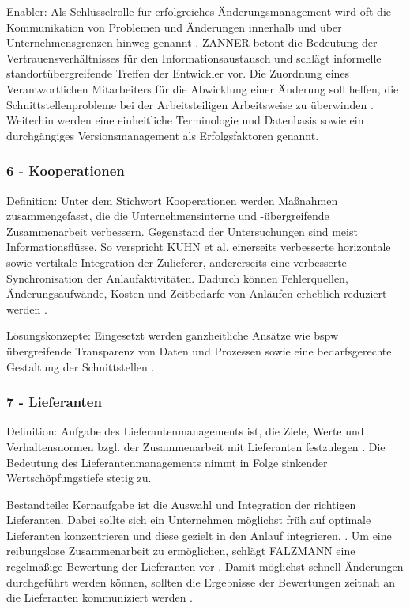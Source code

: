 Enabler: 
Als Schlüsselrolle für erfolgreiches Änderungsmanagement wird oft die Kommunikation von Problemen und Änderungen innerhalb und über Unternehmensgrenzen hinweg genannt \cite{Kuhn2002, Schuh2008}.
ZANNER betont die Bedeutung der Vertrauensverhältnisses für den Informationsaustausch und schlägt informelle standortübergreifende Treffen der Entwickler vor. Die Zuordnung eines Verantwortlichen Mitarbeiters für die Abwicklung einer Änderung soll helfen, die Schnittstellenprobleme bei der Arbeitsteiligen Arbeitsweise zu überwinden  \cite[42]{Zanner2002}.
Weiterhin werden eine einheitliche Terminologie \cite{Zanner2002} und Datenbasis sowie ein durchgängiges Versionsmanagement \cite{Kuhn2002} als Erfolgsfaktoren genannt. 
\subsubsection*{6 - Kooperationen}
Definition: 
Unter dem Stichwort Kooperationen werden Maßnahmen zusammengefasst, die die Unternehmensinterne und -übergreifende Zusammenarbeit verbessern. Gegenstand der Untersuchungen sind meist Informationsflüsse. 
So verspricht KUHN et al. einerseits verbesserte horizontale sowie vertikale Integration der Zulieferer, andererseits eine verbesserte Synchronisation der Anlaufaktivitäten. Dadurch können Fehlerquellen, Änderungsaufwände, Kosten und Zeitbedarfe von Anläufen erheblich reduziert werden \cite[26]{Kuhn2002}. 

Lösungskonzepte:
Eingesetzt werden ganzheitliche Ansätze wie \gls{bspw} übergreifende Transparenz von Daten und Prozessen sowie eine bedarfsgerechte Gestaltung der Schnittstellen \cite{Kuhn2002}. 


\subsubsection*{7 - Lieferanten}
Definition: 
Aufgabe des Lieferantenmanagements ist, die Ziele, Werte und Verhaltensnormen bzgl. der Zusammenarbeit mit Lieferanten festzulegen \cite{Schuh2008}. %
Die Bedeutung des Lieferantenmanagements nimmt in Folge sinkender Wertschöpfungstiefe stetig zu. 

Bestandteile: 
Kernaufgabe ist die Auswahl und Integration der richtigen Lieferanten. Dabei sollte sich ein Unternehmen möglichst früh auf optimale Lieferanten konzentrieren und diese gezielt in den Anlauf integrieren. \cite{Schuh2008}.  %
Um eine reibungslose Zusammenarbeit zu ermöglichen, schlägt FALZMANN eine regelmäßige Bewertung der Lieferanten vor \cite{Falzmann2007}. Damit möglichst schnell Änderungen durchgeführt werden können, sollten die Ergebnisse der Bewertungen zeitnah an die Lieferanten kommuniziert werden \cite{Hofbauer2012}. %

